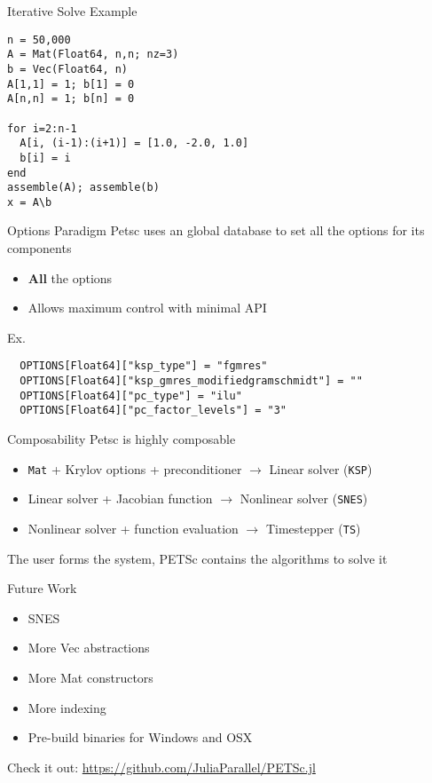 \documentclass{beamer}
\begin{document}
\begin{frame}[fragile]{Iterative Solve Example}
\begin{verbatim}
n = 50,000
A = Mat(Float64, n,n; nz=3)
b = Vec(Float64, n)
A[1,1] = 1; b[1] = 0
A[n,n] = 1; b[n] = 0

for i=2:n-1
  A[i, (i-1):(i+1)] = [1.0, -2.0, 1.0]
  b[i] = i
end
assemble(A); assemble(b)
x = A\b
\end{verbatim}
\end{frame}

\begin{frame}[fragile]{Options Paradigm}
Petsc uses an global database to set all the options for its components
\begin{itemize}
  \item \textbf{All} the options
  \item Allows maximum control with minimal API
\end{itemize}
\hfill

Ex.
\begin{verbatim}
  OPTIONS[Float64]["ksp_type"] = "fgmres"
  OPTIONS[Float64]["ksp_gmres_modifiedgramschmidt"] = ""
  OPTIONS[Float64]["pc_type"] = "ilu"
  OPTIONS[Float64]["pc_factor_levels"] = "3"
\end{verbatim}

\end{frame}

\begin{frame}{Composability}
Petsc is highly composable
\begin{itemize}
  \item \texttt{Mat} + Krylov options + preconditioner $\rightarrow$ Linear solver (\texttt{KSP})
  \item Linear solver + Jacobian function $\rightarrow$ Nonlinear solver (\texttt{SNES})
  \item Nonlinear solver + function evaluation $\rightarrow$ Timestepper (\texttt{TS})
\end{itemize}
\hfill

The user forms the system, PETSc contains the algorithms to solve it
\end{frame}



\begin{frame}{Future Work}
  \begin{itemize}
    \item SNES
    \item More Vec abstractions
    \item More Mat constructors
    \item More indexing
    \item Pre-build binaries for Windows and OSX
  \end{itemize}
\end{frame}

\begin{frame}
\begin{center}  
  Check it out: \hyperref[https://github.com/JuliaParallel/PETSc.jl]{https://github.com/JuliaParallel/PETSc.jl}
\end{center}

\end{frame}
\end{document}
